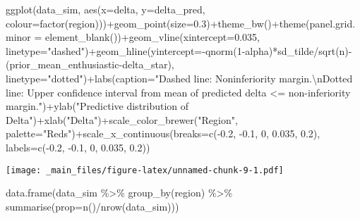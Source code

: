 \documentclass[
]{book}
\newenvironment{Shaded}{\begin{snugshade}}{\end{snugshade}}
\newcommand{\AttributeTok}[1]{\textcolor[rgb]{0.77,0.63,0.00}{#1}}
\newcommand{\DecValTok}[1]{\textcolor[rgb]{0.00,0.00,0.81}{#1}}
\newcommand{\FloatTok}[1]{\textcolor[rgb]{0.00,0.00,0.81}{#1}}
\newcommand{\FunctionTok}[1]{\textcolor[rgb]{0.00,0.00,0.00}{#1}}
\newcommand{\NormalTok}[1]{#1}
\newcommand{\SpecialCharTok}[1]{\textcolor[rgb]{0.00,0.00,0.00}{#1}}
\newcommand{\StringTok}[1]{\textcolor[rgb]{0.31,0.60,0.02}{#1}}
\begin{document}
\begin{Shaded}
\begin{Highlighting}[]
\FunctionTok{ggplot}\NormalTok{(data\_sim, }\FunctionTok{aes}\NormalTok{(}\AttributeTok{x=}\NormalTok{delta, }\AttributeTok{y=}\NormalTok{delta\_pred, }\AttributeTok{colour=}\FunctionTok{factor}\NormalTok{(region)))}\SpecialCharTok{+}\FunctionTok{geom\_point}\NormalTok{(}\AttributeTok{size=}\FloatTok{0.3}\NormalTok{)}\SpecialCharTok{+}\FunctionTok{theme\_bw}\NormalTok{()}\SpecialCharTok{+}\FunctionTok{theme}\NormalTok{(}\AttributeTok{panel.grid.minor =} \FunctionTok{element\_blank}\NormalTok{())}\SpecialCharTok{+}\FunctionTok{geom\_vline}\NormalTok{(}\AttributeTok{xintercept=}\FloatTok{0.035}\NormalTok{, }\AttributeTok{linetype=}\StringTok{"dashed"}\NormalTok{)}\SpecialCharTok{+}\FunctionTok{geom\_hline}\NormalTok{(}\AttributeTok{yintercept=}\SpecialCharTok{{-}}\FunctionTok{qnorm}\NormalTok{(}\DecValTok{1}\SpecialCharTok{{-}}\NormalTok{alpha)}\SpecialCharTok{*}\NormalTok{sd\_tilde}\SpecialCharTok{/}\FunctionTok{sqrt}\NormalTok{(n)}\SpecialCharTok{{-}}\NormalTok{(prior\_mean\_enthusiastic}\SpecialCharTok{{-}}\NormalTok{delta\_star), }\AttributeTok{linetype=}\StringTok{"dotted"}\NormalTok{)}\SpecialCharTok{+}\FunctionTok{labs}\NormalTok{(}\AttributeTok{caption=}\StringTok{"Dashed line: Noninferiority margin.}\SpecialCharTok{\textbackslash{}n}\StringTok{Dotted line: Upper confidence interval from mean of predicted delta \textless{}= non{-}inferiority margin."}\NormalTok{)}\SpecialCharTok{+}\FunctionTok{ylab}\NormalTok{(}\StringTok{"Predictive distribution of Delta"}\NormalTok{)}\SpecialCharTok{+}\FunctionTok{xlab}\NormalTok{(}\StringTok{"Delta"}\NormalTok{)}\SpecialCharTok{+}\FunctionTok{scale\_color\_brewer}\NormalTok{(}\StringTok{"Region"}\NormalTok{, }\AttributeTok{palette=}\StringTok{"Reds"}\NormalTok{)}\SpecialCharTok{+}\FunctionTok{scale\_x\_continuous}\NormalTok{(}\AttributeTok{breaks=}\FunctionTok{c}\NormalTok{(}\SpecialCharTok{{-}}\FloatTok{0.2}\NormalTok{, }\SpecialCharTok{{-}}\FloatTok{0.1}\NormalTok{, }\DecValTok{0}\NormalTok{, }\FloatTok{0.035}\NormalTok{, }\FloatTok{0.2}\NormalTok{), }\AttributeTok{labels=}\FunctionTok{c}\NormalTok{(}\SpecialCharTok{{-}}\FloatTok{0.2}\NormalTok{, }\SpecialCharTok{{-}}\FloatTok{0.1}\NormalTok{, }\DecValTok{0}\NormalTok{, }\FloatTok{0.035}\NormalTok{, }\FloatTok{0.2}\NormalTok{))}
\end{Highlighting}
\end{Shaded}

\texttt{[image: \_main\_files/figure-latex/unnamed-chunk-9-1.pdf]}

\begin{Shaded}
\begin{Highlighting}[]
\FunctionTok{data.frame}\NormalTok{(data\_sim }\SpecialCharTok{\%\textgreater{}\%} \FunctionTok{group\_by}\NormalTok{(region) }\SpecialCharTok{\%\textgreater{}\%} \FunctionTok{summarise}\NormalTok{(}\AttributeTok{prop=}\FunctionTok{n}\NormalTok{()}\SpecialCharTok{/}\FunctionTok{nrow}\NormalTok{(data\_sim)))}
\end{Highlighting}
\end{Shaded}
\end{document}
